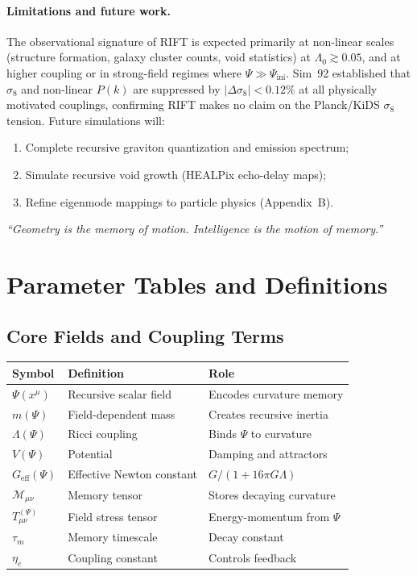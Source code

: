 \documentclass[12pt,a4paper]{article}
\begin{document}
\paragraph{Limitations and future work.}
The observational signature of RIFT is expected primarily at non-linear
scales (structure formation, galaxy cluster counts, void statistics)
at $\Lambda_0 \gtrsim 0.05$, and at higher coupling or in strong-field regimes
where $\Psi \gg \Psi_{\mathrm{ini}}$. Sim~92 established that $\sigma_8$ and
non-linear $P(k)$ are suppressed by $|\Delta\sigma_8| < 0.12\%$ at all
physically motivated couplings, confirming RIFT makes no claim on the
Planck/KiDS $\sigma_8$ tension. Future simulations will:
\begin{enumerate}
  \item Complete recursive graviton quantization and emission spectrum;
  \item Simulate recursive void growth (HEALPix echo-delay maps);
  \item Refine eigenmode mappings to particle physics (Appendix~B).
\end{enumerate}

\emph{``Geometry is the memory of motion. Intelligence is the motion of memory.''}

\appendix

\section{Parameter Tables and Definitions}
\label{app:params}

\subsection{Core Fields and Coupling Terms}

\begin{center}
\begin{tabular}{lll}
\toprule
Symbol & Definition & Role \\
\midrule
$\Psi(x^\mu)$ & Recursive scalar field & Encodes curvature memory \\
$m(\Psi)$ & Field-dependent mass & Creates recursive inertia \\
$\Lambda(\Psi)$ & Ricci coupling & Binds $\Psi$ to curvature \\
$V(\Psi)$ & Potential & Damping and attractors \\
$G_{\mathrm{eff}}(\Psi)$ & Effective Newton constant & $G/(1+16\pi G\Lambda)$ \\
$\mathcal{M}_{\mu\nu}$ & Memory tensor & Stores decaying curvature \\
$T^{(\Psi)}_{\mu\nu}$ & Field stress tensor & Energy-momentum from $\Psi$ \\
$\tau_m$ & Memory timescale & Decay constant \\
$\eta_c$ & Coupling constant & Controls feedback \\
\bottomrule
\end{tabular}
\end{center}
\end{document}

